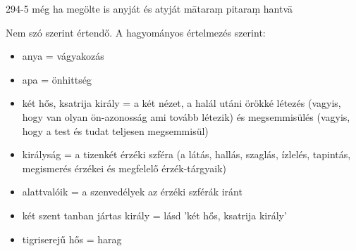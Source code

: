 
\begin{notesdescription}

\item[{294-5}
{még ha megölte is anyját és atyját}
{mātaraṃ pitaraṃ hantvā}] \hfill\par

Nem szó szerint értendő. A hagyományos értelmezés szerint:

\begin{itemize}
\item anya = vágyakozás
\item apa = önhittség
\item két hős, ksatrija király = a két nézet, a halál utáni örökké létezés (vagyis, hogy van olyan ön-azonosság ami tovább létezik) és megsemmisülés (vagyis, hogy a test és tudat teljesen megsemmisül)
\item királyság = a tizenkét érzéki szféra (a látás, hallás, szaglás, ízlelés, tapintás, megismerés érzékei és megfelelő érzék-tárgyaik)
\item alattvalóik = a szenvedélyek az érzéki szférák iránt
\item két szent tanban jártas király = lásd 'két hős, ksatrija király'
\item tigriserejű hős = harag
\end{itemize}

\end{notesdescription}

